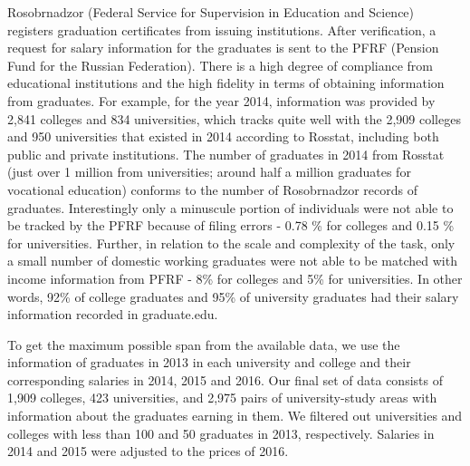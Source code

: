 \documentclass[alpha-refs]{wiley-article-05g}
\begin{document}
Rosobrnadzor (Federal Service for Supervision in Education and Science) 
registers graduation certificates from issuing institutions. After 
verification, a request for salary information for the graduates is sent to 
the PFRF (Pension Fund for the Russian Federation).  There is a high degree 
of compliance from educational institutions and the high fidelity in terms 
of obtaining information from graduates. For example, for the year 2014, 
information was provided by 2,841 colleges and 834 universities, which 
tracks quite well with the 2,909 colleges and 950 universities that existed 
in 2014 according to Rosstat, including both public and private 
institutions. The number of graduates in 2014 from Rosstat (just over 1 
million from universities; around half a million graduates for vocational 
education) conforms to the number of Rosobrnadzor records of graduates. 
Interestingly only a minuscule portion of individuals were not able to be 
tracked by the PFRF because of filing errors - 0.78 \% for colleges and 
0.15 \% for universities. Further, in relation to the scale and complexity 
of the task, only a  small number of domestic working graduates were not 
able to be matched with income information from PFRF - 8\% for colleges and 
5\% for universities. In other words, 92\% of college graduates and 95\% of 
university graduates had their salary information recorded in graduate.edu. 

\vspace{0.5em}

To get the maximum possible span from the available data,  we use the 
information of graduates in 2013 in each university and college and their 
corresponding salaries in 2014, 2015 and 2016. Our final set of data 
consists of 1,909 colleges, 423 universities, and 2,975 pairs of 
university-study areas with information about the graduates earning in 
them. We filtered out universities and colleges with less than 100 and 50 
graduates in 2013, respectively. Salaries in 2014 and 2015 were adjusted to 
the prices of 2016. 
\end{document}

